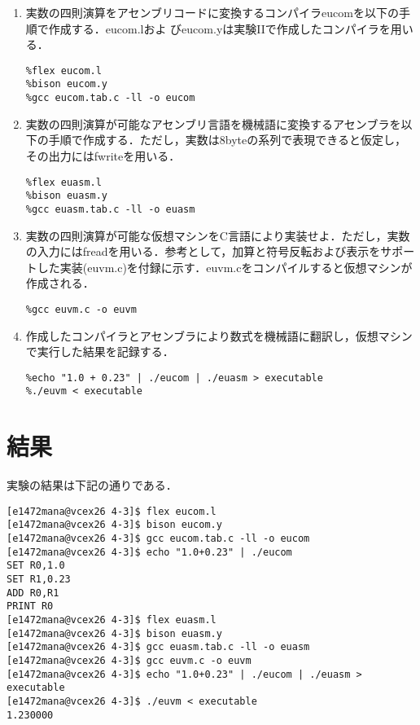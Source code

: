 \documentclass[a4j]{jsarticle}  %
\begin{document}
\begin{enumerate}
\item 実数の四則演算をアセンブリコードに変換するコンパイラeucomを以下の手順で作成する．eucom.lおよ
びeucom.yは実験IIで作成したコンパイラを用いる．
\begin{screen}
\begin{verbatim}
%flex eucom.l
%bison eucom.y
%gcc eucom.tab.c -ll -o eucom
\end{verbatim}
\end{screen}
\item 実数の四則演算が可能なアセンブリ言語を機械語に変換するアセンブラを以下の手順で作成する．ただし，実数は8byteの系列で表現できると仮定し，その出力にはfwriteを用いる．
\begin{screen}
\begin{verbatim}
%flex euasm.l
%bison euasm.y
%gcc euasm.tab.c -ll -o euasm
\end{verbatim}
\end{screen}
\item 実数の四則演算が可能な仮想マシンをC言語により実装せよ．ただし，実数の入力にはfreadを用いる．参考として，加算と符号反転および表示をサポートした実装(euvm.c)を付録に示す．euvm.cをコンパイルすると仮想マシンが作成される．
\begin{screen}
\begin{verbatim}
%gcc euvm.c -o euvm
\end{verbatim}
\end{screen}
\item 作成したコンパイラとアセンブラにより数式を機械語に翻訳し，仮想マシンで実行した結果を記録する．
\begin{screen}
\begin{verbatim}
%echo "1.0 + 0.23" | ./eucom | ./euasm > executable
%./euvm < executable
\end{verbatim}
\end{screen}
\end{enumerate}

\section{結果}
実験の結果は下記の通りである．
\begin{screen}
\begin{verbatim}
[e1472mana@vcex26 4-3]$ flex eucom.l
[e1472mana@vcex26 4-3]$ bison eucom.y
[e1472mana@vcex26 4-3]$ gcc eucom.tab.c -ll -o eucom
[e1472mana@vcex26 4-3]$ echo "1.0+0.23" | ./eucom
SET R0,1.0
SET R1,0.23
ADD R0,R1
PRINT R0
[e1472mana@vcex26 4-3]$ flex euasm.l
[e1472mana@vcex26 4-3]$ bison euasm.y
[e1472mana@vcex26 4-3]$ gcc euasm.tab.c -ll -o euasm
[e1472mana@vcex26 4-3]$ gcc euvm.c -o euvm
[e1472mana@vcex26 4-3]$ echo "1.0+0.23" | ./eucom | ./euasm > executable
[e1472mana@vcex26 4-3]$ ./euvm < executable
1.230000
\end{verbatim}
\end{screen}
\end{document}
